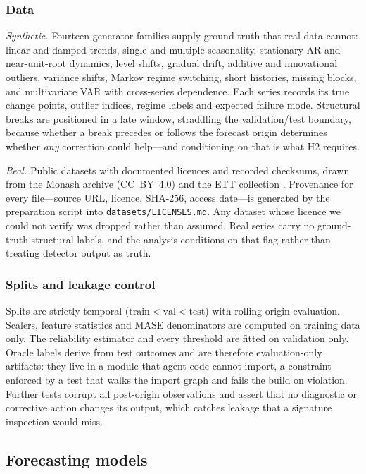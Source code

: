 \subsubsection{Data}

\emph{Synthetic.} Fourteen generator families supply ground truth that real data cannot:
linear and damped trends, single and multiple seasonality, stationary AR and
near-unit-root dynamics, level shifts, gradual drift, additive and innovational
outliers, variance shifts, Markov regime switching, short histories, missing blocks,
and multivariate VAR with cross-series dependence. Each series records its true change
points, outlier indices, regime labels and expected failure mode. Structural breaks are
positioned in a late window, straddling the validation/test boundary, because whether a
break precedes or follows the forecast origin determines whether \emph{any} correction
could help---and conditioning on that is what H2 requires.

\emph{Real.} Public datasets with documented licences and recorded checksums, drawn from
the Monash archive (CC~BY~4.0) \citep{monash2021} and the ETT collection
\citep{informer2021}. Provenance for every file---source URL, licence, SHA-256, access
date---is generated by the preparation script into \texttt{datasets/LICENSES.md}. Any
dataset whose licence we could not verify was dropped rather than assumed. Real series
carry no ground-truth structural labels, and the analysis conditions on that flag rather
than treating detector output as truth.

\subsubsection{Splits and leakage control}

Splits are strictly temporal ($\text{train} < \text{val} < \text{test}$) with
rolling-origin evaluation. Scalers, feature statistics and MASE denominators are
computed on training data only. The reliability estimator and every threshold are fitted
on validation only. Oracle labels derive from test outcomes and are therefore
evaluation-only artifacts: they live in a module that agent code cannot import, a
constraint enforced by a test that walks the import graph and fails the build on
violation. Further tests corrupt all post-origin observations and assert that no
diagnostic or corrective action changes its output, which catches leakage that a
signature inspection would miss.

\subsection{Forecasting models}


